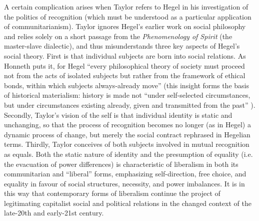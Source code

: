 \documentclass[12pt,oneside]{memoir}
\begin{document}
A certain complication arises when Taylor refers to Hegel in his investigation of the politics of recognition (which must be understood as a particular application of communitarianism). Taylor ignores Hegel's earlier work on social philosophy and relies solely on a short passage from the \textit{Phenomenology of Spirit }(the master-slave dialectic), and thus misunderstands three key aspects of Hegel's social theory. First is that individual subjects are born into social relations. As Honneth puts it, for Hegel ``every philosophical theory of society must proceed not from the acts of isolated subjects but rather from the framework of ethical bonds, within which subjects always-already move'' \citep[14]{honneth-struggle} (this insight forms the basis of historical materialism: history is made not ``under self-selected circumstances, but under circumstances existing already, given and transmitted from the past'' \cite{Marx1963}). Secondly, Taylor's vision of the self is that individual identity is static and unchanging, so that the process of recognition becomes no longer (as in Hegel) a dynamic process of change, but merely the social contract rephrased in Hegelian terms. Thirdly, Taylor conceives of both subjects involved in mutual recognition as equals. Both the static nature of identity and the presumption of equality (i.e. the evacuation of power differences) is characteristic of liberalism in both its communitarian and ``liberal'' forms, emphasizing self-direction, free choice, and equality in favour of social structures, necessity, and power imbalances. It is in this way that contemporary forms of liberalism continue the project of legitimating capitalist social and political relations in the changed context of the late-20th and early-21st century.
\end{document}
